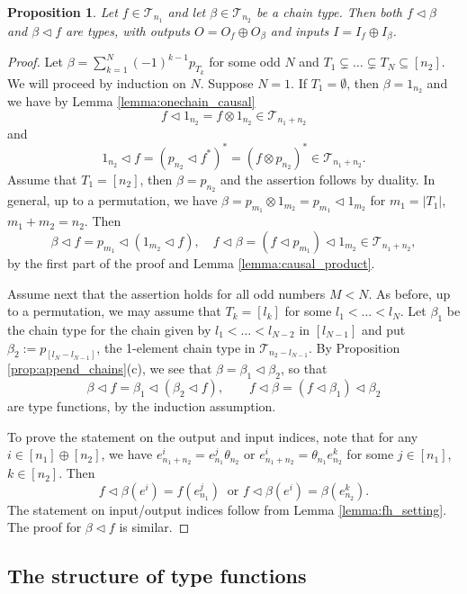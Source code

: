 \documentclass[12pt]{article}
\newtheorem{prop}{Proposition}
\theoremstyle{definition}
\theoremstyle{remark}
\def\Te{\mathcal T}
\def\vtl{\vartriangleleft}
\begin{document}
\begin{prop}\label{prop:append_chain_f}  Let $f\in \Te_{n_1}$ and let $\beta\in \Te_{n_2}$
be a chain type. Then both $f\vtl \beta$ and $\beta\vtl f$ are types, with outputs
$O=O_f\oplus O_\beta$ and inputs $I=I_f\oplus I_\beta$. 

\end{prop}

\begin{proof} Let  $\beta=\sum_{k=1}^{N}(-1)^{k-1}p_{T_k}$
for some odd $N$ and $T_1\subsetneq \dots \subsetneq T_N\subseteq [n_2]$. We will proceed by induction on $N$. Suppose $N=1$. If $T_1=\emptyset$,
then $\beta=1_{n_2}$ and we have by Lemma \ref{lemma:onechain_causal}
\[
f\vtl 1_{n_2}=f\otimes 1_{n_2}\in \Te_{n_1+n_2}
\]
and
\[
1_{n_2}\vtl f=(p_{n_2}\vtl f^*)^*=(f\otimes p_{n_2})^*\in \Te_{n_1+n_2}.
\]
Assume that  $T_1=[n_2]$, then $\beta=p_{n_2}$ and the assertion follows by duality. 
In general,  up to a permutation, we have $\beta=p_{m_1}\otimes
1_{m_2}=p_{m_1}\vtl 1_{m_2}$ for $m_1=|T_1|$, $m_1+m_2=n_2$. Then 
\[
\beta\vtl f=p_{m_1}\vtl (1_{m_2}\vtl f),\quad f\vtl \beta=(f\vtl p_{m_1})\vtl 1_{m_2} \in
\Te_{n_1+n_2},
\]
by the first part of the proof and Lemma \ref{lemma:causal_product}.

Assume next that the assertion holds for all odd numbers $M<N$. As before, up to a
permutation, we may assume that $T_k=[l_k]$ for some $l_1<\dots<l_{N}$. Let $\beta_1$ be the chain
type for the chain given by $l_1<\dots<l_{N-2}$ in $[l_{N-1}]$ and put
$\beta_2:=p_{[l_{N}-l_{N-1}]}$, the 1-element chain type in $\Te_{n_2-l_{N-1}}$. By
Proposition \ref{prop:append_chains}(c), we see
that $\beta=\beta_1\vtl\beta_2$, so that 
\[
\beta\vtl f=\beta_1\vtl(\beta_2\vtl f),\qquad f\vtl\beta=(f\vtl\beta_1)\vtl\beta_2
\]
are type functions, by the induction assumption. 


To prove the statement on the output and input indices, note that for any $i\in [n_1]\oplus [n_2]$, we have  $e^i_{n_1+n_2}=e^j_{n_1}\theta_{n_2}$ or
$e^i_{n_1+n_2}=\theta_{n_1}e^k_{n_2}$
for some $j\in [n_1]$, $k\in [n_2]$. Then   
\[
f\vtl\beta(e^i)=f(e^j_{n_1})\ \text{ or } f\vtl \beta(e^i)=\beta(e^k_{n_2}).
\]
The statement on input/output indices  follow from Lemma \ref{lemma:fh_setting}. The proof
for $\beta\vtl f$ is similar. 

\end{proof}


\subsection{The structure of type functions}
\end{document}

